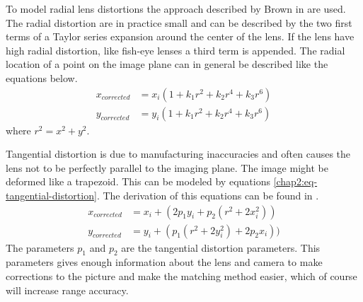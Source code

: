 To model radial lens distortions the approach described by Brown in
\cite{lens-calibration} are used. The radial distortion are in practice small and can be
described by the two first terms of a Taylor series expansion around the center of the
lens. If the lens have high radial distortion, like fish-eye lenses a third term is
appended. The radial location of a point on the image plane can in general be described
like the equations below. 
\begin{equation}
\begin{aligned}
    x_{corrected} &= x_i ( 1 + k_1 r^2 + k_2 r^4 + k_3 r^6 ) \\
    y_{corrected} &= y_i ( 1 + k_1 r^2 + k_2 r^4 + k_3 r^6 ) 
\end{aligned}
\end{equation}
where $r^2 = x^2 + y^2$.

Tangential distortion is due to manufacturing inaccuracies and often causes the lens not to be
perfectly parallel to the imaging plane. The image might be deformed like a
trapezoid. This can be modeled by equations \eqref{chap2:eq-tangential-distortion}. The
derivation of this equations can be found in \cite{brown66}.
\begin{equation}
    \label{chap2:eq-tangential-distortion}
    \begin{aligned}
        x_{corrected} &= x_i + (2 p_1 y_i + p_2 (r^2 + 2 x_i^2)) \\
        y_{corrected} &= y_i + ( p_1 (r^2 + 2 y_i^2) + 2 p_2 x_i))
    \end{aligned}
\end{equation}
The parameters $p_1$ and $p_2$ are the tangential distortion parameters. This parameters
gives enough information about the lens and camera to make corrections to the picture and
make the matching method easier, which of course will increase range accuracy. 


